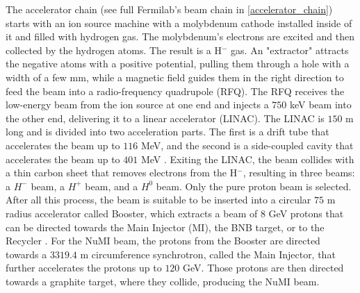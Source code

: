 The accelerator chain (see full Fermilab's beam chain in \ref{accelerator_chain}) starts with an ion source machine with a molybdenum cathode installed inside of it and filled with hydrogen gas. The molybdenum's electrons are excited and then collected by the hydrogen atoms. The result is a H$^-$ gas. An "extractor" attracts the negative atoms with a positive potential, pulling them through a hole with a width of a few mm, while a magnetic field guides them in the right direction to feed the beam into a radio-frequency quadrupole (RFQ). The RFQ receives the low-energy beam from the ion source at one end and injects a $750$ keV \cite{RFQ_website} beam into the other end, delivering it to a linear accelerator (LINAC). The LINAC is $150$ m  long and is divided into two acceleration parts. The first is a drift tube that accelerates the beam up to $116$ MeV, and the second is a side-coupled cavity that accelerates the beam up to $401$ MeV \cite{LINAC_website}. Exiting the LINAC, the beam collides with a thin carbon sheet that removes electrons from the H$^-$, resulting in three beams: a $H^-$ beam, a $H^+$ beam, and a $H^0$ beam. Only the pure proton beam is selected. After all this process, the beam is suitable to be inserted into a circular $75$ m radius accelerator called Booster, which extracts a beam of $8$ GeV protons that can be directed towards the Main Injector (MI), the BNB target, or to the Recycler \cite{booster_website}. For the NuMI beam, the protons from the Booster are directed towards a $3319.4$ m circumference synchrotron, called the Main Injector, that further accelerates the protons up to $120$ GeV. Those protons are then directed towards a graphite target, where they collide, producing the NuMI beam.

